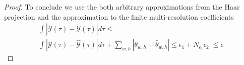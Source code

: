 \begin{proof}
To conclude we use the both arbitrary approximations from the Haar projection and the approximation to the finite multi-resolution coefficients
\begin{align*}
    \int |\mathcal{Y}(\tau) -\tilde{\mathcal{Y}}(\tau)| d\tau    
    \leq \qquad\qquad\qquad\qquad\qquad\qquad\qquad\quad\\
    \int |\mathcal{Y}(\tau) - \hat{\mathcal{Y}}(\tau)| d \tau 
    +
    \sum_{w,h} |\theta_{w,h} - \hat{\theta}_{w,h}| %
    \leq \epsilon_{1} + N_{\epsilon_{1}} \epsilon_{2} \; \leq \epsilon
\end{align*}
\end{proof}





